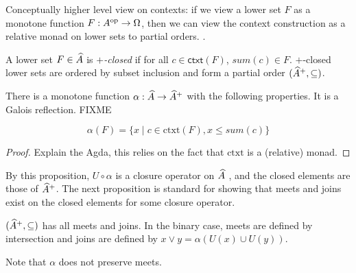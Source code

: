 \begin{remark}
  Conceptually higher level view on contexts: if we view a lower set
  $F$ as a monotone function $F : A^{\mathrm{op}} \to \Omega$, then we can view
  the context construction as a relative monad on lower sets to
  partial orders.  .
\end{remark}

\begin{definition}
  A lower set $F \in \widehat{A}$ is \emph{$+$-closed} if for all
  $c \in \mathsf{ctxt}(F)$, $\mathit{sum}(c) \in F$. $+$-closed lower
  sets are ordered by subset inclusion and form a partial order
  $(\widehat{A}^+, \subseteq)$.
\end{definition}

\begin{proposition}
  There is a monotone function
  $\alpha : \widehat{A} \to \widehat{A}^+$ with the following
  properties. It is a Galois reflection. FIXME

  \begin{displaymath}
    \alpha(F) = \{ x \mid c \in \mathrm{ctxt}(F), x \leq \mathit{sum}(c) \}
  \end{displaymath}
\end{proposition}

\begin{proof}
  Explain the Agda, this relies on the fact that $\mathrm{ctxt}$ is a
  (relative) monad.
\end{proof}

\begin{remark}
  By this proposition, $U \circ \alpha$ is a closure operator on
  $\widehat{A}$ \cite{davey-priestley}, and the closed elements are
  those of $\widehat{A}^+$. The next proposition is standard for
  showing that meets and joins exist on the closed elements for some
  closure operator.
\end{remark}

\begin{proposition}
  $(\widehat{A}^+, \subseteq)$ has all meets and joins. In the
  binary case, meets are defined by intersection and joins are defined
  by $x \lor y = \alpha (U(x) \cup U(y))$.
\end{proposition}

\begin{remark}
  Note that $\alpha$ does not preserve meets.
\end{remark}

\begin{proposition}\label{prop:closed-monoid-distrib}
\end{proposition}

